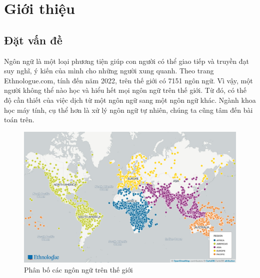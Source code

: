 \chapter{Giới thiệu}
\label{Chapter1}



\section{Đặt vấn đề}
Ngôn ngữ là một loại phương tiện giúp con người có thể giao tiếp và truyền đạt suy nghĩ, ý kiến của mình cho những người xung quanh. Theo trang Ethnologue.com, tính đến năm 2022, trên thế giới có 7151 ngôn ngữ. Vì vậy, một người không thể nào học và hiểu hết mọi ngôn ngữ trên thế giới. Từ đó, có thế độ cần thiết của việc dịch từ một ngôn ngữ sang một ngôn ngữ khác. Ngành khoa học máy tính, cụ thể hơn là xử lý ngôn ngữ tự nhiên, chúng ta cũng tâm đến bài toán trên.

\begin{figure}[H]
    \begin{center}
        \includegraphics[scale=0.4]{images/number_of_langs}
        \caption{Phân bố các ngôn ngữ trên thế giới}
        \label{fig:languages_distibuttion}
    \end{center}
\end{figure}

